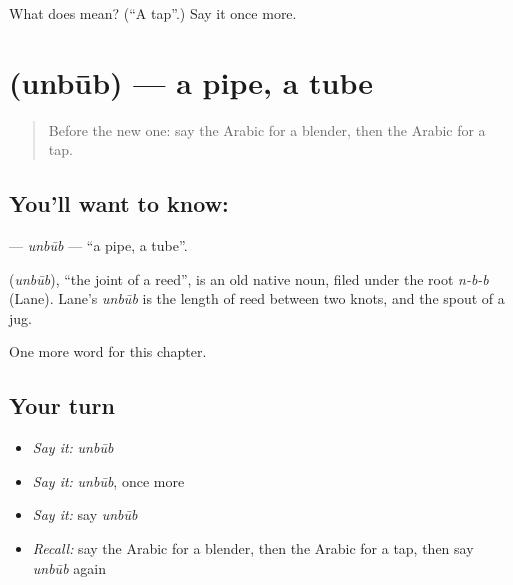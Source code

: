 \begin{tcolorbox}[breakable,colback=teal!4,colframe=teal!35!black,title={Before you move on}]
What does  mean? (\textquotedblleft{}A tap\textquotedblright{}.) Say it once more.
\end{tcolorbox}
\section[\texorpdfstring{\ar{أنبوب} (unbūb)}{أنبوب (unbūb)}]{ (unbūb) — a pipe, a tube}

\label{lesson:AR-C187-unbub}



\begin{quote}
Before the new one: say the Arabic for a blender, then the Arabic for a tap.
\end{quote}

\subsection*{You'll want to know: }
\textbf{} — \emph{unbūb} — \textquotedblleft{}a pipe, a tube\textquotedblright{}.

\begin{cousinweb}
\textbf{} (\emph{unbūb}), \textquotedblleft{}the joint of a reed\textquotedblright{}, is an old native noun, filed under the root \emph{n-b-b} (Lane). Lane's \emph{unbūb} is the length of reed between two knots, and the spout of a jug.
\end{cousinweb}

\begin{grammarlens}[title={What you've built}]
One more word for this chapter.
\end{grammarlens}

\subsection*{Your turn}
\begin{itemize}
\raggedright
  \item \emph{Say it:} \emph{unbūb}
  \item \emph{Say it:} \emph{unbūb}, once more
  \item \emph{Say it:} say \emph{unbūb}
  \item \emph{Recall:} say the Arabic for a blender, then the Arabic for a tap, then say \emph{unbūb} again
\end{itemize}

